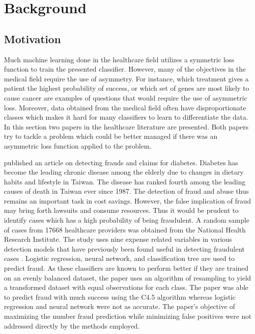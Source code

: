 \documentclass[twoside,11pt]{article}
\begin{document}
\section{Background}\label{background}
\subsection{Motivation}\label{motivation}

Much machine learning done in the healthcare field utilizes a symmetric loss function to train the presented classifier. However, many of the objectives in the medical field require the use of asymmetry. For instance, which treatment gives a patient the highest probability of success, or which set of genes are most likely to cause cancer are examples of questions that would require the use of asymmetric loss. Moreover, data obtained from the medical field often have disproportionate classes which makes it hard for many classifiers to learn to differentiate the data. In this section two papers in the healthcare literature are presented. Both papers try to tackle a problem which could be better managed if there was an asymmetric loss function applied to the problem.

\citet{Liou08} published an article on detecting frauds and claims for diabetes. Diabetes has become the leading chronic disease among the elderly due to changes in dietary habits and lifestyle in Taiwan. The disease has ranked fourth among the leading causes of death in Taiwan ever since 1987. The detection of fraud and abuse thus remains an important task in cost savings. However, the false implication of fraud may bring forth lawsuits and consume resources. Thus it would be prudent to identify cases which has a high probability of being fraudulent. A random sample of cases from 17668 healthcare providers was obtained from the National Health Research Institute. The study uses nine expense related variables in various detection models that have previously been found useful in detecting fraudulent cases \citep{Yang06}. Logistic regression, neural network, and classification tree are used to predict fraud. As these classifiers are known to perform better if they are trained on an evenly balanced dataset, the paper uses an algorithm of resampling to yield a transformed dataset with equal observations for each class. The paper was able to predict fraud with much success using the C4.5 algorithm whereas logistic regression and neural network were not as accurate. The paper's objective of maximizing the number fraud prediction while minimizing false positives were not addressed directly by the methods employed. 
\end{document}
